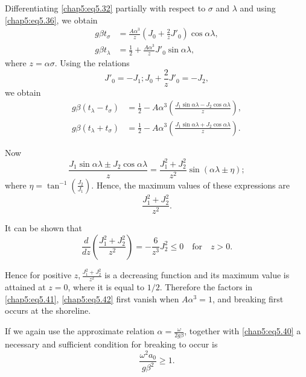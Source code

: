 Differentiating \eqref{chap5:eq5.32} partially with respect to $\sigma$ and $\lambda$ and using \eqref{chap5:eq5.36}, we obtain 
\begin{align*}
g\beta t_\sigma &= \frac{A\alpha^3}{z}\left(J_0+\frac{2}{z}J'_0\right)\cos \alpha\lambda,\\
g\beta t_\lambda &= \frac{1}{2}+\frac{A\alpha^3}{z}J'_0\sin\alpha\lambda,
\end{align*}\pageoriginale
where $z=\alpha\sigma$. Using the relations
$$
J'_0= -J_1;J_0+\frac{2}{z}J'_0= -J_2,
$$
we obtain
\begin{align}
g\beta\left(t_\lambda-t_\sigma\right) &= \frac{1}{2}-A\alpha^3\left(\frac{J_1\sin \alpha\lambda-J_2\cos\alpha\lambda}{z}\right),\tag{5.41}\label{chap5:eq5.41}\\
g\beta\left(t_\lambda+t_\sigma\right) &=\frac{1}{2}-A\alpha^3\left(\frac{J_1\sin \alpha\lambda+J_2\cos\alpha\lambda}{z}\right).\tag{5.42}\label{chap5:eq5.42}
\end{align}

Now
$$
\frac{J_1\sin\alpha\lambda\pm J_2\cos\alpha\lambda}{z}=\frac{J_1^2+J_2^2}{z^2} \sin(\alpha\lambda\pm\eta);
$$
where $\eta=\tan^{-1}(\frac{J_2}{J_1})$. Hence, the maximum values of these expressions are 
$$
\frac{J_1^2+J_2^2}{z^2}.
$$

It can be shown that
$$
\frac{d}{dz}\left(\frac{J_1^2+J_2^2}{z^2}\right)=-\frac{6}{z^3}J_2^2\leq 0\quad \text{for}\quad z>0.
$$

Hence for positive $z,\frac{J_1^2+J_2^2}{z^2}$ is a decreasing function and its maximum value is attained at $z=0$, where it is equal to $1/2$. Therefore the factors in \eqref{chap5:eq5.41}, \eqref{chap5:eq5.42} first vanish when $A\alpha^3=1$, and breaking first occurs at the shoreline.

If we again use the approximate relation $\alpha=\frac{\omega}{2g\beta}$, together with \eqref{chap5:eq5.40} a necessary and sufficient condition for breaking to occur is 
\begin{equation}
\frac{\omega^2a_0}{g\beta^2}\geq 1.\tag{5.43}\label{chap5:eq5.43}
\end{equation}\pageoriginale

